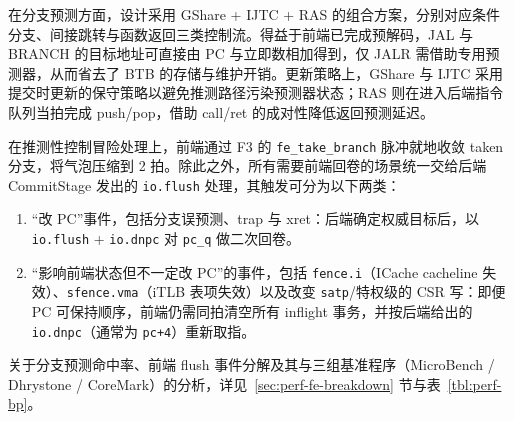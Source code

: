 在分支预测方面，设计采用 GShare + IJTC + RAS 的组合方案，分别对应条件分支、间接跳转与函数返回三类控制流。得益于前端已完成预解码，JAL 与 BRANCH 的目标地址可直接由 PC 与立即数相加得到，仅 JALR 需借助专用预测器，从而省去了 BTB 的存储与维护开销。更新策略上，GShare 与 IJTC 采用提交时更新的保守策略以避免推测路径污染预测器状态；RAS 则在进入后端指令队列当拍完成 push/pop，借助 call/ret 的成对性降低返回预测延迟。

在推测性控制冒险处理上，前端通过 F3 的 \lstinline|fe_take_branch| 脉冲就地收敛 taken 分支，将气泡压缩到 2 拍。除此之外，所有需要前端回卷的场景统一交给后端 CommitStage 发出的 \lstinline|io.flush| 处理，其触发可分为以下两类：

\begin{enumerate}
  \item “改 PC”事件，包括分支误预测、trap 与 xret：后端确定权威目标后，以 \lstinline|io.flush| + \lstinline|io.dnpc| 对 \lstinline|pc_q| 做二次回卷。
  \item “影响前端状态但不一定改 PC”的事件，包括 \lstinline|fence.i|（ICache cacheline 失效）、\lstinline|sfence.vma|（iTLB 表项失效）以及改变 \lstinline|satp|/特权级的 CSR 写：即便 PC 可保持顺序，前端仍需同拍清空所有 inflight 事务，并按后端给出的 \lstinline|io.dnpc|（通常为 \lstinline|pc+4|）重新取指。
\end{enumerate}

关于分支预测命中率、前端 flush 事件分解及其与三组基准程序（MicroBench / Dhrystone / CoreMark）的分析，详见~\ref{sec:perf-fe-breakdown} 节与表~\ref{tbl:perf-bp}。
